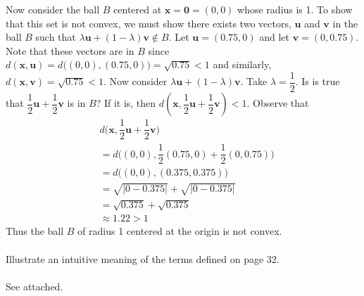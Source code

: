 \documentclass[12pt]{article}
\begin{document}
Now consider the ball $B$ centered at $\mathbf{x}=\textbf{0}=(0,0)$ whose radius is 1. To show that this set is not convex, we must show there exists two vectors, $\textbf{u}$ and $\textbf{v}$ in the ball $B$ such that $\lambda \textbf{u} + (1- \lambda)\textbf{v} \notin B$. Let $\textbf{u} = (0.75,0)$ and let $\textbf{v}=(0,0.75)$. Note that these vectors are in $B$ since $d(\textbf{x}, \textbf{u})=d\big((0,0),(0.75,0)\big)=\sqrt{0.75}<1$ and similarly, $d(\textbf{x}, \textbf{v})=\sqrt{0.75}<1$. Now consider $\lambda \textbf{u} + (1- \lambda)\textbf{v} $. Take $\lambda=\dfrac{1}{2}$. Is is true that $\dfrac{1}{2} \textbf{u} + \dfrac{1}{2} \textbf{v}$ is in $B$? If it is, then $d(\textbf{x}, \dfrac{1}{2} \textbf{u} + \dfrac{1}{2} \textbf{v}) < 1$. Observe that 
\begin{align*}
   & d \big(\textbf{x}, \dfrac{1}{2} \textbf{u} + \dfrac{1}{2} \textbf{v} \big) \\ 
   & = d \big( (0,0), \dfrac{1}{2} (0.75,0) + \dfrac{1}{2} (0,0.75) \big) \\
   & = d \big( (0,0), (0.375, 0.375) \big) \\ 
   & = \sqrt{|0-0.375|}+\sqrt{|0-0.375|} \\
   & = \sqrt{0.375} + \sqrt{0.375} \\
   & \approx 1.22 > 1
\end{align*}
Thus the ball $B$ of radius 1 centered at the origin is not convex. \\ \\
 
\problem Illustrate an intuitive meaning of the terms defined on page 32. \\ \\

See attached. 
\end{document}
